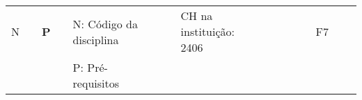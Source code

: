 \begin{landscape}
\begin{table}[h!]
\begin{tabular}{lcllcllcllcllcllcl}
\multicolumn{1}{|l|}{N}   & \multicolumn{1}{c|}{}                                                                                                    & \multicolumn{1}{l|}{{\bf P}} &                                                 & \multicolumn{2}{l}{N: Código da disciplina}                                                                                                                                                                 &                         & \multicolumn{1}{l}{}                                                                                                     & \multicolumn{3}{l}{CH na instituição: 2406}                                                                                                                                                                                 &                                                       &                         & \multicolumn{1}{l}{}                                                                                                                & \multicolumn{1}{l|}{}         & \multicolumn{1}{l|}{F7}                         & \multicolumn{1}{c|}{}                                                                                                                                 & \multicolumn{1}{l|}{}                                 \\ \cline{1-1} \cline{3-3} \cline{16-16} \cline{18-18} 
\multicolumn{1}{l|}{}     & \multicolumn{1}{c|}{}                                                                                                    &                              &                                                 & \multicolumn{2}{l}{P: Pré-requisitos}                                                                                                                                                                       &                         & \multicolumn{1}{l}{}                                                                                                     &                               &                                                 & \multicolumn{1}{l}{}                                                                                                                      &                                                       &                         & \multicolumn{1}{l}{}                                                                                                                &                               & \multicolumn{1}{l|}{}                           & \multicolumn{1}{c|}{}                                                                                                                                 &                                                       \\

\end{tabular}
\end{table}
\end{landscape}
